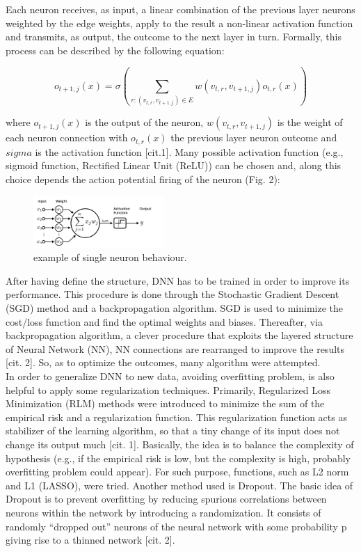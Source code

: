 \documentclass[prl,twocolumn]{revtex4-1}
\begin{document}
Each neuron receives, as input, a linear combination of the previous layer neurons weighted by the edge weights, apply to the result a non-linear activation function and transmits, as output, the outcome to the next layer in turn. Formally, this process can be described by the following equation:

\begin{equation}
o_{t+1,j}(x) = \sigma \left(\sum_{r:(v_{t,r}, v_{t+1,j}) \in E}w(v_{t,r}, v_{t+1,j})o_{t,r}(x)\right)
\label{eq:simple}
\end{equation}

where \(o_{t+1,j}(x)\) is the output of the neuron, \(w(v_{t,r}, v_{t+1,j})\) is the weight of each neuron connection with \(o_{t,r}(x)\) the previous layer neuron outcome and \(sigma\) is the activation function [cit.1]. Many possible activation function (e.g., sigmoid function, Rectified Linear Unit (ReLU)) can be chosen and, along this choice depends the action potential firing of the neuron (Fig. 2):

\begin{figure}[h]
	\includegraphics[width=0.44\textwidth]{Activation.png}
	\caption{example of single neuron behaviour.}
	\label{fig:y}
\end{figure}

After having define the structure, DNN has to be trained in order to improve its performance.  This procedure is done through the Stochastic Gradient Descent (SGD) method and a backpropagation algorithm. SGD is used to minimize the cost/loss function and find the optimal weights and biases. Thereafter, via backpropagation algorithm, a clever procedure that exploits the layered structure of Neural Network (NN), NN connections are rearranged to improve the results [cit. 2]. So, as to optimize the outcomes, many algorithm were attempted. \\
In order to generalize DNN to new data, avoiding overfitting problem, is also helpful to apply some regularization techniques. Primarily, Regularized Loss Minimization (RLM) methods were introduced to minimize the sum of the empirical risk and a regularization function. This regularization function acts as stabilizer of the learning algorithm, so that a tiny change of its input does not change its output much [cit. 1]. Basically, the idea is to balance the complexity of hypothesis (e.g., if the empirical risk is low, but the complexity is high, probably overfitting problem could appear). For such purpose, functions, such as L2 norm and L1 (LASSO), were tried. Another method used is Dropout. The basic idea of Dropout is to prevent overfitting by reducing spurious correlations between neurons within the network by introducing a randomization. It consists of randomly “dropped out” neurons of the neural network with some probability p giving rise to a thinned network [cit. 2]. \\
\end{document}
